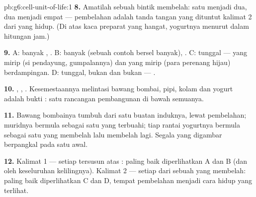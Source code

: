 \begin{solution}{pb:g6:cell-unit-of-life:1}
\textbf{8.} Amatilah sebuah bintik membelah: satu menjadi dua, dua
menjadi empat --- pembelahan adalah tanda tangan yang dituntut kalimat
2 dari yang hidup. (Di atas kaca preparat yang hangat, 
yogurtnya menurut dalam hitungan jam.)

\textbf{9.} A: banyak , . B: banyak  (sebuah contoh
 bersel banyak), . C:  tunggal --- yang mirip  (si
pendayung, gumpalannya) dan yang mirip  (para perenang hijau)
berdampingan. D:  tunggal, bukan  dan bukan  ---
.

\textbf{10.} , , . Kesemestaannya melintasi
bawang bombai, pipi, kolam dan yogurt adalah bukti :
satu rancangan pembangunan di bawah semuanya.

\textbf{11.} Bawang bombainya tumbuh dari satu  buatan 
induknya, lewat pembelahan; muridnya bermula sebagai satu 
yang terbuahi; tiap rantai yogurtnya bermula sebagai satu  yang
membelah lalu membelah lagi. Segala yang digambar berpangkal pada satu
 awal.

\textbf{12.} Kalimat 1 --- setiap  tersusun atas :
paling baik diperlihatkan A dan B (dan oleh keseluruhan kelilingnya).
Kalimat 2 --- setiap  dari sebuah  yang membelah: paling baik
diperlihatkan C dan D, tempat pembelahan menjadi cara hidup yang
terlihat.
\end{solution}
